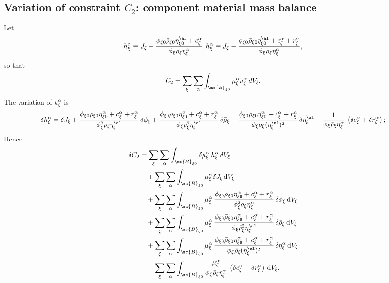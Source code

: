 \subsection{Variation of constraint $C_2$: component material mass balance}
\label{sec:var_C2_app}

Let
\begin{equation}
  h_\xi^\alpha \equiv J_\xi - \frac{\phi_{\xi0}\bar\rho_{\xi0} \eta^\al_{\xi 0} + c_\xi^\alpha}{\phi_\xi\bar\rho_\xi \eta_\xi^\alpha},
  h_\xi^\alpha \equiv J_\xi - \frac{\phi_{\xi0}\bar\rho_{\xi0} \eta^\al_{\xi 0} + c_\xi^\alpha + r_\xi^\alpha}{\phi_\xi\bar\rho_\xi \eta_\xi^\alpha},
\end{equation}
so that
\begin{equation}
  C_2 = \sum_\xi\sum_\alpha\int_{\mc{B}_{\xi0}}\mu_\xi^\alpha h_\xi^\alpha\,dV_\xi.
  \label{eq:C2_component_measure}
\end{equation}
%
The variation of \(h_\xi^\alpha\) is
%
\begin{equation}
  \delta h_\xi^\alpha
  = \delta J_\xi
  + \frac{\phi_{\xi0}\bar\rho_{\xi0}\eta^\alpha_{\xi0} + c_\xi^\alpha + r_\xi^\alpha}{\phi_\xi^2\bar\rho_\xi \eta^\al_\xi}\,\delta\phi_\xi
  + \frac{\phi_{\xi0}\bar\rho_{\xi0}\eta^\alpha_{\xi0} + c_\xi^\alpha + r_\xi^\alpha}{\phi_\xi\bar\rho_\xi^2 \eta^\al_\xi}\,\delta\bar\rho_\xi
  + \frac{\phi_{\xi0}\bar\rho_{\xi0}\eta^\alpha_{\xi0} + c_\xi^\alpha + r_\xi^\alpha}{\phi_\xi\bar\rho_\xi (\eta^\al_\xi)^2}\,\delta\eta^\al_\xi
  - \frac{1}{\phi_\xi\bar\rho_\xi \eta_\xi^\alpha}\,\left(\delta c_\xi^\alpha + \delta r_\xi^\alpha\right);
  \label{eq:dh}
\end{equation}
%
Hence
%
\begin{align}
  \delta C_2
  &= \sum_\xi\sum_\alpha \int_{\mc{B}_{\xi0}}
      \delta\mu_\xi^\alpha\, h_\xi^\alpha \, dV_\xi
  \notag \\
  &\quad
  + \sum_\xi\sum_\alpha \int_{\mc{B}_{\xi0}}
      \mu_\xi^\alpha \delta J_\xi \, {\rm d}V_\xi
  \notag \\
  &\quad
  + \sum_\xi\sum_\alpha \int_{\mc{B}_{\xi0}}
      \mu_\xi^\alpha\,\frac{\phi_{\xi0}\bar\rho_{\xi0}\eta_{\xi0}^\alpha + c_\xi^\alpha + r_\xi^\alpha}{\phi_\xi^2\bar\rho_\xi \eta_\xi^\alpha}\,\delta\phi_\xi \, {\rm d}V_\xi
  \notag \\
  &\quad
  + \sum_\xi\sum_\alpha \int_{\mc{B}_{\xi0}}
      \mu_\xi^\alpha\,\frac{\phi_{\xi0}\bar\rho_{\xi0}\eta_{\xi0}^\alpha + c_\xi^\alpha + r_\xi^\alpha}{\phi_\xi \bar\rho_\xi^2 \eta^\al_\xi}\,\delta\bar\rho_\xi \, {\rm d}V_\xi
  \notag \\
  &\quad
  + \sum_\xi\sum_\alpha \int_{\mc{B}_{\xi0}}
      \mu_\xi^\alpha\,\frac{\phi_{\xi0}\bar\rho_{\xi0}\eta_{\xi0}^\alpha + c_\xi^\alpha + r_\xi^\alpha}{\phi_\xi \bar\rho_\xi (\eta^\al_\xi)^2}\,\delta\eta_\xi^\alpha \, {\rm d}V_\xi
  \notag \\
  &\quad
  - \sum_\xi\sum_\alpha \int_{\mc{B}_{\xi0}}
      \frac{\mu_\xi^\alpha}{\phi_\xi\bar\rho_\xi \eta_\xi^\alpha}\,\left(\delta c_\xi^\alpha + \delta r_\xi^\alpha\right) \, {\rm d}V_\xi.
  \label{eq:deltaC2_lines}
\end{align}
